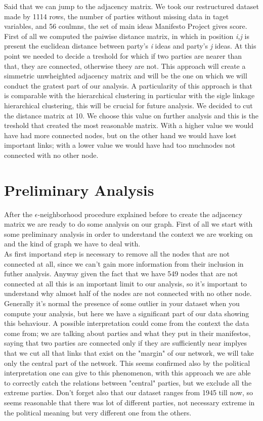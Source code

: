 \documentclass{article}%
\begin{document}
Said that we can jump to the adjacency matrix. We took our restructured dataset made by 1114 rows, the number of parties without missing data in taget variables, and 56 coulmns, the set of main ideas Manifesto Project gives score. First of all we computed the paiwise distance matrix, in which in position \emph{i,j} is present the euclidean distance between party's \emph{i} ideas and party's \emph{j} ideas. 
At this point we needed to decide a treshold for which if two parties are nearer than that, they are connected, otherwise theey are not. This approach will create a simmetric unwheighted adjacency matrix and will be the one on which we will conduct the gratest part of our analysis.
A particularity of this approach is that is comparable with the hierarchical clustering in particular with the sigle linkage hierarchical clustering, this will be crucial for future analysis.
We decided to cut the distance matrix at 10. We choose this value on further analysis and this is the treshold that created the most reasonable matrix. With a higher value we would have had more connected nodes, but on the other hand we would have lost important links; with a lower value we would have had too muchnodes not connected with no other node.

\section*{Preliminary Analysis}

After the $\epsilon$-neighborhood procedure explained before to create the adjacency matrix we are ready to do some analysis on our graph. First of all we start with some preliminary analysis in order to understand the context we are working on and the kind of graph we have to deal with.
\\

As first importand step is necessary to remove all the nodes that are not connected at all, since we can't gain more information from their inclusion in futher analysis. Anyway given the fact that we have 549 nodes that are not connected at all this is an important limit to our analysis, so it's important to understand why almost half of the nodes are not connected with no other node. Generally it's normal the presence of some outlier in your dataset when you compute your analysis,  but here we have a significant part of our data showing this behaviour. A possible interpretation could come from the context the data come from; we are talking about parties and what they put in their manifestos, saying that two parties are connected only if they are sufficiently near implyes that we cut all that links that exist on the "margin" of our network, we will take only the central part of the network. This seems confirmed also by the political interpretation one can give to this phenomenon, with this approach we are able to correctly catch the relations between "central" parties, but we exclude all the extreme parties.
Don't forget also that our dataset ranges from 1945 till now, so seems reasonable that there was lot of different parties, not necessary extreme in the political meaning but very different one from the others.
\end{document}
